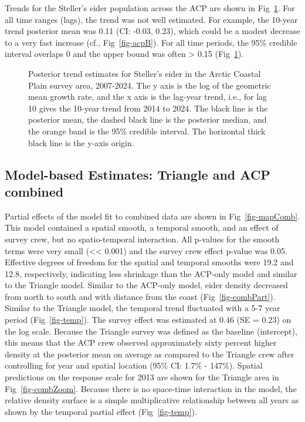 \documentclass[
  10pt,
  letterpaper,
]{article}
\begin{document}
Trends for the Steller's eider population across the ACP are shown in
Fig~\ref{fig-trendACP}. For all time ranges (lags), the trend was not
well estimated. For example, the 10-year trend posterior mean was 0.11
(CI: -0.03, 0.23), which could be a modest decrease to a very fast
increase (cf., Fig~\ref{fig-acpB}). For all time periods, the 95\%
credible interval overlaps 0 and the upper bound was often
\textgreater{} 0.15 (Fig~\ref{fig-trendACP}).

\begin{figure}

\caption{\label{fig-trendACP}Posterior trend estimates for Steller's
eider in the Arctic Coastal Plain survey area, 2007-2024. The y axis is
the log of the geometric mean growth rate, and the x axis is the
lag-year trend, i.e., for lag 10 gives the 10-year trend from 2014 to
2024. The black line is the posterior mean, the dashed black line is the
posterior median, and the orange band is the 95\% credible interval. The
horizontal thick black line is the y-axis origin.}

\end{figure}%

\subsection{Model-based Estimates: Triangle and ACP
combined}\label{model-based-estimates-triangle-and-acp-combined}

Partial effects of the model fit to combined data are shown in
Fig~\ref{fig-mapComb}. This model contained a spatial smooth, a temporal
smooth, and an effect of survey crew, but no spatio-temporal
interaction. All p-values for the smooth terms were very small
(\textless\textless{} 0.001) and the survey crew effect p-value was
0.05. Effective degrees of freedom for the spatial and temporal smooths
were 19.2 and 12.8, respectively, indicating less shrinkage than the
ACP-only model and similar to the Triangle model. Similar to the
ACP-only model, eider density decreased from north to south and with
distance from the coast (Fig~\ref{fig-combPart}). Similar to the
Triangle model, the temporal trend fluctuated with a 5-7 year period
(Fig~\ref{fig-temp}). The survey effect was estimated at 0.46 (SE =
0.23) on the log scale. Because the Triangle survey was defined as the
baseline (intercept), this means that the ACP crew observed
approximately sixty percent higher density at the posterior mean on
average as compared to the Triangle crew after controlling for year and
spatial location (95\% CI: 1.7\% - 147\%). Spatial predictions on the
response scale for 2013 are shown for the Triangle area in
Fig~\ref{fig-combZoom}. Because there is no space-time interaction in
the model, the relative density surface is a simple multiplicative
relationship between all years as shown by the temporal partial effect
(Fig~\ref{fig-temp}).
\end{document}
